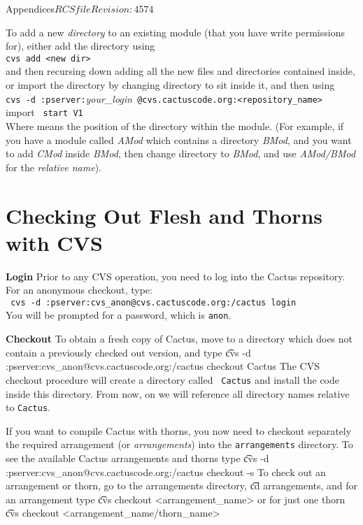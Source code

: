 \begin{cactuspart}{Appendices}{$RCSfile$}{$Revision: 4574 $}
\begin{description}
To add a new \textit{directory} {\tt <new dir>} to an existing module (that you have write permissions for), either add the directory using\\
{\tt cvs add <new dir>}\\
and then recursing down adding all the new files and directories contained
inside, or import the directory by changing directory to sit inside it, and then using\\
{\tt cvs -d :pserver:}\textit{your\_login}{\tt
@cvs.cactuscode.org:<repository\_name> } import {\tt <relative name> start V1}\\
Where {\tt <relative name>} means the position of the directory within the module. (For example, if you have a module called \textit{AMod} which contains a
directory \textit{BMod}, and you want to add \textit{CMod} inside \textit{BMod}, then change directory to \textit{BMod}, and use \textit{AMod/BMod} for the \textit{relative name}).


\end{description}

\section{Checking Out Flesh and Thorns with CVS}

\begin{Lentry}
\item[{\bf Login}] Prior to any CVS operation, you need to log into the Cactus
  repository. For an anonymous checkout, type:\\
  {\tt
    cvs -d :pserver:cvs\_anon@cvs.cactuscode.org:/cactus login
    }\\
  You will be prompted for a password, which is {\tt anon}.
\item[{\bf Checkout}] To obtain a fresh copy of Cactus, move to a directory
  which does not contain a previously checked out version, and type
  {\t
    cvs -d :pserver:cvs\_anon@cvs.cactuscode.org:/cactus checkout Cactus
    }
  The CVS checkout procedure will create a directory called {\tt
  Cactus} and install the code inside this directory.  From now, on we
  will reference all directory names relative to {\tt Cactus}.

\noindent
  If you want to compile Cactus with thorns, you now need to checkout
  separately the required arrangement (or \textit{arrangements})
   into the {\tt arrangements} directory. To see the
  available Cactus arrangements and thorns type
  {\t
    cvs -d :pserver:cvs\_anon@cvs.cactuscode.org:/cactus checkout -s
  }
  To check out an arrangement or thorn, go to the arrangements directory,  {\t cd arrangements},
  and  for an arrangement type
{\t
  cvs checkout <arrangement\_name>
  }
        or for just one thorn
{\t
cvs checkout <arrangement\_name/thorn\_name>
}


\end{Lentry}
\end{cactuspart}
